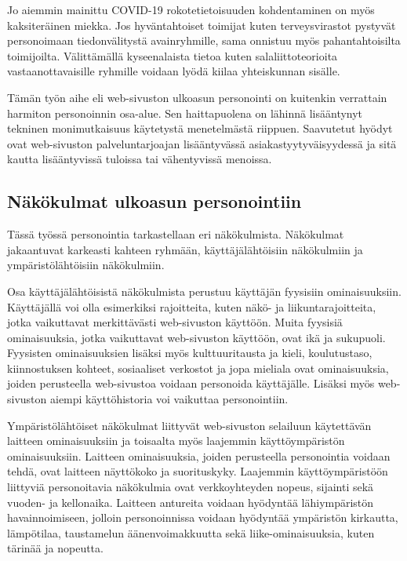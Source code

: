 \documentclass[finnish, 12pt, a4paper, elec, utf8, a-1b, online]{aaltothesis}
\begin{document}
Jo aiemmin mainittu COVID-19 rokotetietoisuuden kohdentaminen on myös
kaksiteräinen miekka. Jos hyväntahtoiset toimijat kuten terveysvirastot pystyvät
personoimaan tiedonvälitystä avainryhmille, sama onnistuu myös pahantahtoisilta
toimijoilta. Välittämällä kyseenalaista tietoa kuten salaliittoteorioita
vastaanottavaisille ryhmille voidaan lyödä kiilaa yhteiskunnan sisälle.

Tämän työn aihe eli web-sivuston ulkoasun personointi on kuitenkin verrattain
harmiton personoinnin osa-alue. Sen haittapuolena on lähinnä lisääntynyt
tekninen monimutkaisuus käytetystä menetelmästä riippuen. Saavutetut hyödyt ovat
web-sivuston palveluntarjoajan lisääntyvässä asiakastyytyväisyydessä ja sitä
kautta lisääntyvissä tuloissa tai vähentyvissä menoissa.

\subsection{Näkökulmat ulkoasun personointiin}\label{personalization-aspects}

Tässä työssä personointia tarkastellaan eri näkökulmista. Näkökulmat jakaantuvat
karkeasti kahteen ryhmään, käyttäjälähtöisiin näkökulmiin ja ympäristölähtöisiin
näkökulmiin.

Osa käyttäjälähtöisistä näkökulmista perustuu käyttäjän fyysisiin
ominaisuuksiin. Käyttäjällä voi olla esimerkiksi rajoitteita, kuten näkö- ja
liikuntarajoitteita, jotka vaikuttavat merkittävästi web-sivuston käyttöön.
Muita fyysisiä ominaisuuksia, jotka vaikuttavat web-sivuston käyttöön, ovat ikä
ja sukupuoli. Fyysisten ominaisuuksien lisäksi myös kulttuuritausta ja kieli,
koulutustaso, kiinnostuksen kohteet, sosiaaliset verkostot ja jopa mieliala ovat
ominaisuuksia, joiden perusteella web-sivustoa voidaan personoida käyttäjälle.
Lisäksi myös web-sivuston aiempi käyttöhistoria voi vaikuttaa personointiin.

Ympäristölähtöiset näkökulmat liittyvät web-sivuston selailuun käytettävän
laitteen ominaisuuksiin ja toisaalta myös laajemmin käyttöympäristön
ominaisuuksiin. Laitteen ominaisuuksia, joiden perusteella personointia voidaan
tehdä, ovat laitteen näyttökoko ja suorituskyky. Laajemmin käyttöympäristöön
liittyviä personoitavia näkökulmia ovat verkkoyhteyden nopeus, sijainti sekä
vuoden- ja kellonaika. Laitteen antureita voidaan hyödyntää lähiympäristön
havainnoimiseen, jolloin personoinnissa voidaan hyödyntää ympäristön kirkautta,
lämpötilaa, taustamelun äänenvoimakkuutta sekä liike-ominaisuuksia, kuten
tärinää ja nopeutta.
\end{document}
